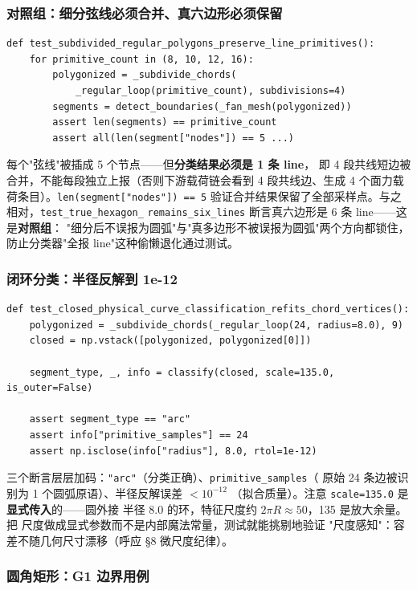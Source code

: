 \documentclass[12pt,a4paper]{ctexart}
\newcommand{\fem}{\Verb}
\begin{document}
\subsubsection{对照组：细分弦线必须合并、真六边形必须保留}

\begin{lstlisting}
def test_subdivided_regular_polygons_preserve_line_primitives():
    for primitive_count in (8, 10, 12, 16):
        polygonized = _subdivide_chords(
            _regular_loop(primitive_count), subdivisions=4)
        segments = detect_boundaries(_fan_mesh(polygonized))
        assert len(segments) == primitive_count
        assert all(len(segment["nodes"]) == 5 ...)
\end{lstlisting}

每个"弦线"被插成 5 个节点——但\textbf{分类结果必须是 1 条 line}，
即 4 段共线短边被合并，不能每段独立上报（否则下游载荷链会看到
4 段共线边、生成 4 个面力载荷条目）。\fem|len(segment["nodes"]) == 5|
验证合并结果保留了全部采样点。与之相对，\fem|test_true_hexagon_|
\fem|remains_six_lines| 断言真六边形是 6 条 line——这是\textbf{对照组}：
"细分后不误报为圆弧"与"真多边形不被误报为圆弧"两个方向都锁住，
防止分类器"全报 line"这种偷懒退化通过测试。

\subsubsection{闭环分类：半径反解到 1e-12}

\begin{lstlisting}
def test_closed_physical_curve_classification_refits_chord_vertices():
    polygonized = _subdivide_chords(_regular_loop(24, radius=8.0), 9)
    closed = np.vstack([polygonized, polygonized[0]])

    segment_type, _, info = classify(closed, scale=135.0, is_outer=False)

    assert segment_type == "arc"
    assert info["primitive_samples"] == 24
    assert np.isclose(info["radius"], 8.0, rtol=1e-12)
\end{lstlisting}

三个断言层层加码：\fem|"arc"|（分类正确）、\fem|primitive_samples|（
原始 24 条边被识别为 1 个圆弧原语）、半径反解误差 $<10^{-12}$
（拟合质量）。注意 \fem|scale=135.0| 是\textbf{显式传入}的——圆外接
半径 8.0 的环，特征尺度约 $2\pi R \approx 50$，135 是放大余量。把
尺度做成显式参数而不是内部魔法常量，测试就能挑剔地验证
"尺度感知"：容差不随几何尺寸漂移（呼应 §8 微尺度纪律）。

\subsubsection{圆角矩形：G1 边界用例}
\end{document}
